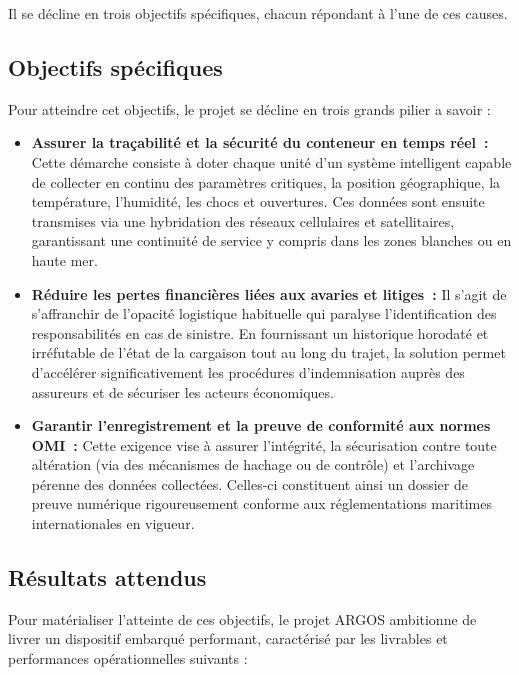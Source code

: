 Il se décline en trois objectifs spécifiques, chacun répondant à l'une de ces causes.

\subsection{Objectifs spécifiques}

Pour atteindre cet objectifs, le projet se décline en trois grands pilier a savoir :

\begin{itemize}[label=\textcolor{argosblue}{\textbf{>}}]
\item \textbf{Assurer la traçabilité et la sécurité du conteneur en temps réel~:}
Cette démarche consiste à doter chaque unité d'un système intelligent capable de collecter en continu des paramètres critiques, la position géographique, la température, l'humidité, les chocs et ouvertures. Ces données sont ensuite transmises via une hybridation des réseaux cellulaires et satellitaires, garantissant une continuité de service y compris dans les zones blanches ou en haute mer.

\item \textbf{Réduire les pertes financières liées aux avaries et litiges~:}
Il s'agit de s'affranchir de l'opacité logistique habituelle qui paralyse l'identification des responsabilités en cas de sinistre. En fournissant un historique horodaté et irréfutable de l'état de la cargaison tout au long du trajet, la solution permet d'accélérer significativement les procédures d'indemnisation auprès des assureurs et de sécuriser les acteurs économiques.

\item \textbf{Garantir l'enregistrement et la preuve de conformité aux normes OMI~:}
Cette exigence vise à assurer l'intégrité, la sécurisation contre toute altération (via des mécanismes de hachage ou de contrôle) et l'archivage pérenne des données collectées. Celles-ci constituent ainsi un dossier de preuve numérique rigoureusement conforme aux réglementations maritimes internationales en vigueur.
\end{itemize}

\subsection{Résultats attendus}

Pour matérialiser l'atteinte de ces objectifs, le projet ARGOS ambitionne de livrer un dispositif embarqué performant, caractérisé par les livrables et performances opérationnelles suivants :

